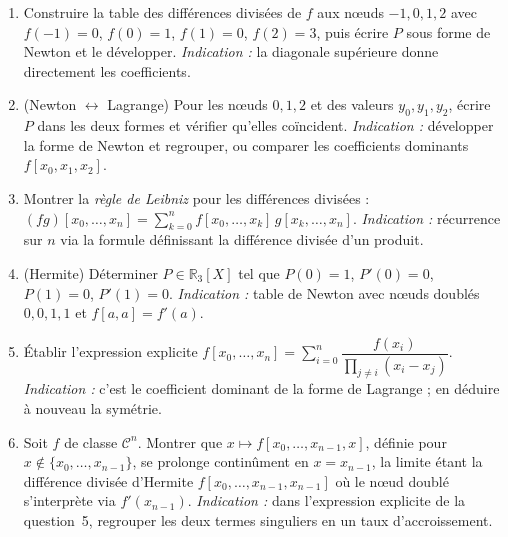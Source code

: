 \begin{mdframed}[style=exobar]
  \begin{enumerate}
    \item Construire la table des différences divisées de $f$ aux nœuds
          $-1,0,1,2$ avec $f(-1)=0$, $f(0)=1$, $f(1)=0$, $f(2)=3$, puis
          écrire $P$ sous forme de Newton et le développer.
          \textit{Indication :} la diagonale supérieure donne directement
          les coefficients.

    \item (Newton $\leftrightarrow$ Lagrange) Pour les nœuds $0,1,2$ et des
          valeurs $y_0,y_1,y_2$, écrire $P$ dans les deux formes et vérifier
          qu'elles coïncident. \textit{Indication :} développer la forme de
          Newton et regrouper, ou comparer les coefficients dominants
          $f[x_0,x_1,x_2]$.

    \item Montrer la \emph{règle de Leibniz} pour les différences divisées :
          $(fg)[x_0,\ldots,x_n]=\sum_{k=0}^{n} f[x_0,\ldots,x_k]\,
          g[x_k,\ldots,x_n]$. \textit{Indication :} récurrence sur $n$
          via la formule définissant la différence divisée d'un produit.

    \item (Hermite) Déterminer $P\in\mathbb{R}_3[X]$ tel que $P(0)=1$,
          $P'(0)=0$, $P(1)=0$, $P'(1)=0$. \textit{Indication :} table de
          Newton avec nœuds doublés $0,0,1,1$ et
          $f[a,a]=f'(a)$.

    \item Établir l'expression explicite
          $f[x_0,\ldots,x_n]=\sum_{i=0}^{n}
          \dfrac{f(x_i)}{\prod_{j\neq i}(x_i-x_j)}$.
          \textit{Indication :} c'est le coefficient dominant de la forme
          de Lagrange ; en déduire à nouveau la symétrie.

    \item Soit $f$ de classe $\mathcal{C}^n$. Montrer que
          $x\mapsto f[x_0,\ldots,x_{n-1},x]$, définie pour
          $x\notin\{x_0,\ldots,x_{n-1}\}$, se prolonge continûment en
          $x=x_{n-1}$, la limite étant la différence divisée d'Hermite
          $f[x_0,\ldots,x_{n-1},x_{n-1}]$ où le nœud doublé s'interprète
          via $f'(x_{n-1})$. \textit{Indication :} dans l'expression
          explicite de la question~5, regrouper les deux termes singuliers
          en un taux d'accroissement.
  \end{enumerate}
\end{mdframed}

